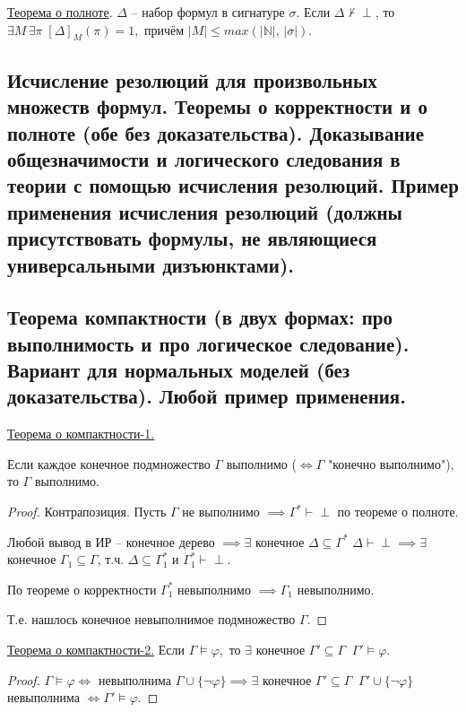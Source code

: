 \documentclass[a4paper, fleqn]{article}
\begin{document}
    \underline{Теорема о полноте}. $\Delta$ -- набор формул в сигнатуре $\sigma$. Если $\Delta \nvdash \perp$, то $\exists M \, \exists \pi \; [\Delta]_M (\pi) = 1,$ причём $|M| \leq max(|\mathbb{N}|, \, | \sigma|). $


    \subsection{Исчисление резолюций для произвольных множеств формул. Теоремы о корректности и о полноте (обе без доказательства). Доказывание общезначимости и логического следования в теории с помощью исчисления резолюций. Пример применения исчисления резолюций (должны присутствовать формулы, не являющиеся универсальными дизъюнктами).}

    
    \subsection*{Теорема компактности (в двух формах: про выполнимость и про логическое следование). Вариант для нормальных моделей (без доказательства). Любой пример применения.}

    \underline{Теорема о компактности-1.}
    
    Если каждое конечное подмножество $\Gamma$ выполнимо ($\iff \Gamma$ "конечно выполнимо"), то $\Gamma$ выполнимо.

    \begin{proof} Контрапозиция. Пусть $\Gamma$ не выполнимо $\implies \Gamma^* \vdash \perp$  по теореме о полноте.
    
    Любой вывод в ИР -- конечное дерево $\implies \exists $ конечное $\Delta \subseteq \Gamma^*$ $\Delta \vdash \perp \implies \exists$ конечное $\Gamma_1 \subseteq \Gamma$, т.ч. $\Delta \subseteq \Gamma^*_1$ и $\Gamma^*_1 \vdash \perp.$
    
    По теореме о корректности $\Gamma^*_1$ невыполнимо $\implies \Gamma_1$ невыполнимо.
    
    Т.е. нашлось конечное невыполнимое подмножество $\Gamma.$
    
    \end{proof}
    
    \underline{Теорема о компактности-2.} Если $\Gamma \vDash \varphi,$ то $\exists$ конечное $\Gamma' \subseteq \Gamma \; \; \Gamma' \vDash \varphi.$
    
    \begin{proof} 

    $\Gamma \vDash \varphi \iff $ невыполнима  $\Gamma \cup \{ \neg \varphi\} \implies \exists$  конечное $\Gamma' \subseteq \Gamma \; \; \Gamma' \cup \{\neg \varphi \}$  невыполнима $\iff \Gamma' \vDash \varphi.$
    
    \end{proof}
    
\end{document}
